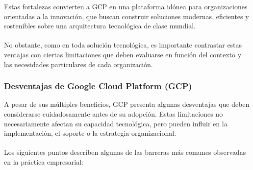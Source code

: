 {                Estas fortalezas convierten a GCP en una plataforma idónea para organizaciones orientadas a la innovación, que buscan construir soluciones modernas, eficientes y sostenibles sobre una arquitectura tecnológica de clase mundial.
                
                \paragraph{} No obstante, como en toda solución tecnológica, es importante contrastar estas ventajas con ciertas limitaciones que deben evaluarse en función del contexto y las necesidades particulares de cada organización.
                
            \subsubsection{Desventajas de Google Cloud Platform (GCP)}
                A pesar de sus múltiples beneficios, GCP presenta algunas desventajas que deben considerarse cuidadosamente antes de su adopción. Estas limitaciones no necesariamente afectan su capacidad tecnológica, pero pueden influir en la implementación, el soporte o la estrategia organizacional.
                
                \paragraph{}Los siguientes puntos describen algunas de las barreras más comunes observadas en la práctica empresarial:
                
}
